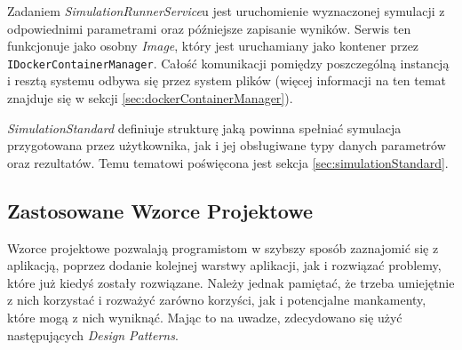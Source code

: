 \par Zadaniem \emph{SimulationRunnerService}u jest uruchomienie wyznaczonej symulacji z odpowiednimi parametrami oraz późniejsze zapisanie wyników. Serwis ten funkcjonuje jako osobny \emph{\docker Image}, który jest uruchamiany jako kontener przez \texttt{IDockerContainerManager}. Całość komunikacji pomiędzy poszczególną instancją i resztą systemu odbywa się przez system plików (więcej informacji na ten temat znajduje się w sekcji \ref{sec:dockerContainerManager}).

\par \emph{SimulationStandard} definiuje strukturę jaką powinna spełniać symulacja przygotowana przez użytkownika, jak i jej obsługiwane typy danych parametrów oraz rezultatów. Temu tematowi poświęcona jest sekcja \ref{sec:simulationStandard}.

\subsection{Zastosowane Wzorce Projektowe}
\label{subsec:zastosowaneWzorceProjektowe}

\par Wzorce projektowe pozwalają programistom w szybszy sposób zaznajomić się z aplikacją, poprzez dodanie kolejnej warstwy aplikacji, jak i rozwiązać problemy, które już kiedyś zostały rozwiązane. Należy jednak pamiętać, że trzeba umiejętnie z nich korzystać i rozważyć zarówno korzyści, jak i potencjalne mankamenty, które mogą z nich wyniknąć. Mając to na uwadze, zdecydowano się użyć następujących \emph{Design Patterns}.

